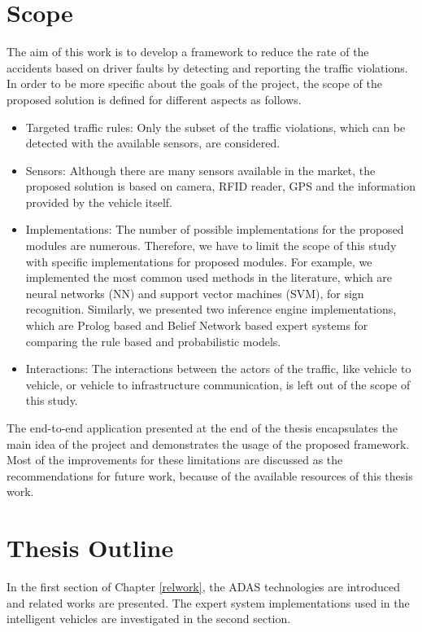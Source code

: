 \documentclass[a4paper,oneside,12pt]{report}
\begin{document}
\section{Scope}
The aim of this work is to develop a framework to reduce the rate of the accidents based on driver faults by detecting and reporting the traffic violations. In order to be more specific about the goals of the project, the scope of the proposed solution is defined for different aspects as follows.
\begin{itemize}
	\item Targeted traffic rules: Only the subset of the traffic violations, which can be detected with the available sensors, are considered.
	\item Sensors: Although there are many sensors available in the market, the proposed solution is based on camera, RFID reader, GPS and the information provided by the vehicle itself. 
	\item	Implementations: The number of possible implementations for the proposed modules are numerous. Therefore, we have to limit the scope of this study with specific implementations for proposed modules. For example, we implemented the most common used methods in the literature, which are neural networks (NN) and support vector machines (SVM), for sign recognition. Similarly, we presented two inference engine implementations, which are Prolog based and Belief Network based expert systems for comparing the rule based and probabilistic models.
	\item Interactions: The interactions between the actors of the traffic, like vehicle to vehicle, or vehicle to infrastructure communication, is left out of the scope of this study.
\end{itemize}
The end-to-end application presented at the end of the thesis encapsulates the main idea of the project and demonstrates the usage of the proposed framework. Most of the improvements for these limitations are discussed as the recommendations for future work, because of the available resources of this thesis work.


\section{Thesis Outline}

In the first section of Chapter \ref{relwork}, the ADAS technologies are introduced and related works are presented. The expert system implementations used in the intelligent vehicles are investigated in the second section. 
\end{document}
